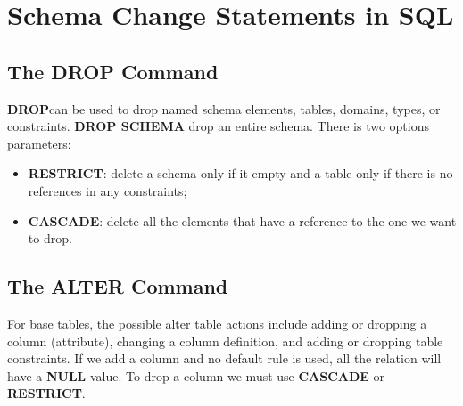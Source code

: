 \section{Schema Change Statements in SQL}
\subsection{The DROP Command}
\textbf{DROP}can be used to drop named schema elements, tables, domains, types, or constraints. \textbf{DROP SCHEMA} drop an entire schema. There is two options parameters:
\begin{itemize}
\item \textbf{RESTRICT}: delete a schema only if it empty and a table only if there is no references in any constraints;
\item \textbf{CASCADE}: delete all the elements that have a reference to the one we want to drop.
\end{itemize}

\subsection{The ALTER Command}
For base tables, the possible alter table actions include adding or dropping a column (attribute), changing a column definition, and adding or dropping table constraints. If we add a column and no default rule is used, all the relation will have a \textbf{NULL} value.
To drop a column we must use \textbf{CASCADE} or \textbf{RESTRICT}.

